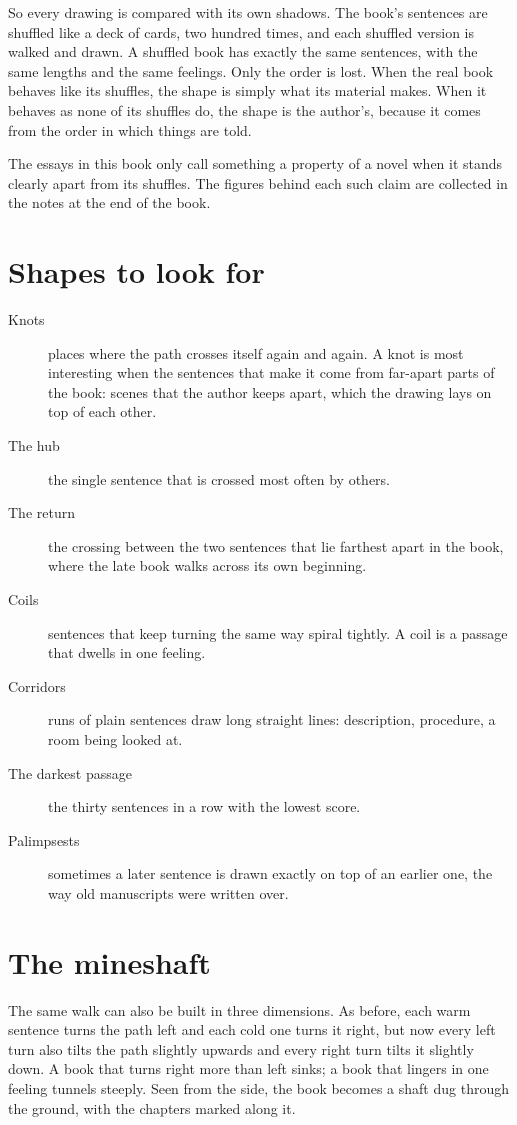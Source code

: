 So every drawing is compared with its own shadows. The book's sentences are
shuffled like a deck of cards, two hundred times, and each shuffled version is
walked and drawn. A shuffled book has exactly the same sentences, with the same
lengths and the same feelings. Only the order is lost. When the real book
behaves like its shuffles, the shape is simply what its material makes. When
it behaves as none of its shuffles do, the shape is the author's, because it
comes from the order in which things are told.

The essays in this book only call something a property of a novel when it
stands clearly apart from its shuffles. The figures behind each such claim are
collected in the notes at the end of the book.

\section{Shapes to look for}

\begin{description}
\item[Knots] places where the path crosses itself again and again. A knot is
most interesting when the sentences that make it come from far-apart parts of
the book: scenes that the author keeps apart, which the drawing lays on top of
each other.
\item[The hub] the single sentence that is crossed most often by others.
\item[The return] the crossing between the two sentences that lie farthest
apart in the book, where the late book walks across its own beginning.
\item[Coils] sentences that keep turning the same way spiral tightly. A coil is
a passage that dwells in one feeling.
\item[Corridors] runs of plain sentences draw long straight lines: description,
procedure, a room being looked at.
\item[The darkest passage] the thirty sentences in a row with the lowest score.
\item[Palimpsests] sometimes a later sentence is drawn exactly on top of an
earlier one, the way old manuscripts were written over.
\end{description}

\section{The mineshaft}

The same walk can also be built in three dimensions. As before, each warm
sentence turns the path left and each cold one turns it right, but now every
left turn also tilts the path slightly upwards and every right turn tilts it
slightly down. A book that turns right more than left sinks; a book that
lingers in one feeling tunnels steeply. Seen from the side, the book becomes a
shaft dug through the ground, with the chapters marked along it.

